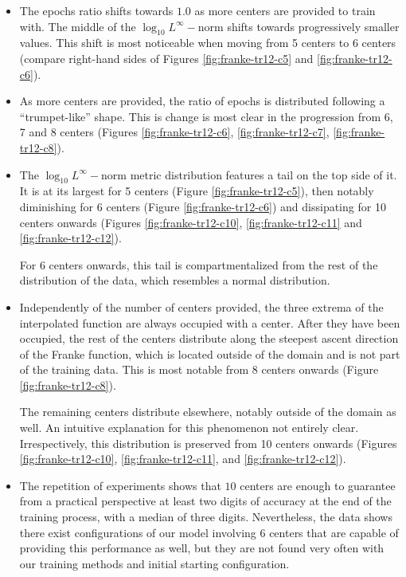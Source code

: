 \documentclass[12pt]{report} %
\begin{document}
\begin{itemize}
  \item The epochs ratio shifts towards $1.0$ as more centers are 
  provided to train with. The middle of the $\log_{10}L^\infty-$norm 
  shifts towards progressively smaller values. This shift is most noticeable when
  moving from 5 centers to 6 centers (compare right-hand sides of Figures 
  \ref{fig:franke-tr12-c5} and \ref{fig:franke-tr12-c6}).
  \item As more centers are provided, the ratio of epochs is distributed 
  following a ``trumpet-like'' shape. This is change is most clear in the progression
  from 6, 7 and 8 centers (Figures \ref{fig:franke-tr12-c6}, \ref{fig:franke-tr12-c7},
  \ref{fig:franke-tr12-c8}).
  \item The $\log_{10}L^\infty-$norm metric distribution features a tail on the top
  side of it. It is at its largest for 5 centers (Figure \ref{fig:franke-tr12-c5}),
  then notably diminishing for 6 centers (Figure \ref{fig:franke-tr12-c6})
  and dissipating for 10 centers onwards (Figures \ref{fig:franke-tr12-c10}, 
  \ref{fig:franke-tr12-c11} and \ref{fig:franke-tr12-c12}).
  
  For 6 centers onwards, this tail is compartmentalized from the rest of the 
  distribution of the data, which resembles a normal distribution.

  \item Independently of the number of centers provided, the three extrema of the
  interpolated function are always occupied with a center. After they have been
  occupied, the rest of the centers distribute along the steepest ascent direction
  of the Franke function, which is located outside of the domain and is not part of
  the training data. This is
  most notable from 8 centers onwards (Figure \ref{fig:franke-tr12-c8}).

  The remaining centers distribute elsewhere, notably outside of the domain 
  as well. An intuitive explanation for this phenomenon not entirely clear.
  Irrespectively, this distribution is preserved from 10 centers onwards (Figures 
  \ref{fig:franke-tr12-c10}, \ref{fig:franke-tr12-c11}, and
  \ref{fig:franke-tr12-c12}).

  \item The repetition of experiments shows that $10$ centers are enough to guarantee
  from a practical perspective at least two digits of accuracy at the end of the
  training process, with a median of three digits. Nevertheless, the data shows 
  there exist configurations of our model involving 6 centers that are capable of
  providing this performance as well, but they are not found very often with our
  training methods and initial starting configuration.
\end{itemize}
\end{document}
